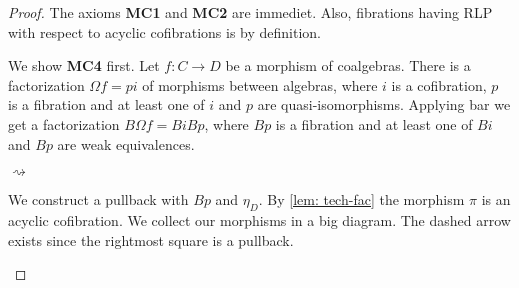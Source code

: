 \documentclass[../thesis.tex]{subfiles}
\begin{document}
            \begin{proof}
                The axioms \textbf{MC1} and \textbf{MC2} are immediet. Also, fibrations having RLP with respect to acyclic cofibrations is by definition.

                We show \textbf{MC4} first. Let $f : C\rightarrow D$ be a morphism of coalgebras. There is a factorization $\Omega f = pi$ of morphisms between algebras, where $i$ is a cofibration, $p$ is a fibration and at least one of $i$ and $p$ are quasi-isomorphisms. Applying bar we get a factorization $B\Omega f = BiBp$, where $Bp$ is a fibration and at least one of $Bi$ and $Bp$ are weak equivalences.
                \begin{center}
                     $\rightsquigarrow$
                \end{center}

                We construct a pullback with $Bp$ and $\eta_D$. By \ref{lem: tech-fac} the morphism $\pi$ is an acyclic cofibration. We collect our morphisms in a big diagram. The dashed arrow exists since the rightmost square is a pullback.
                \begin{center}
                \end{center}
                

\end{proof}
\end{document}
